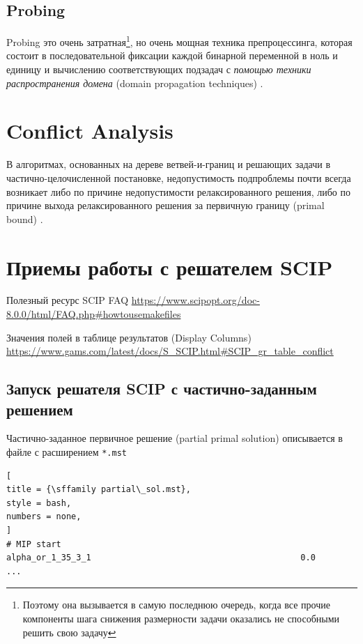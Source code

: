 \documentclass[%
	11pt,
	a4paper,
	utf8,
		]{article}
\begin{document}
\subsection{Probing}

Probing это очень затратная\footnote{Поэтому она вызывается в самую последнюю очередь, когда все прочие компоненты шага снижения размерности задачи оказались не способными решить свою задачу}, но очень мощная техника препроцессинга, которая состоит в последовательной фиксации каждой бинарной переменной в ноль и единицу и вычислению соответствующих подзадач с \emph{помощью техники распространения домена} (domain propagation techniques) \cite[]{achterberg:constr_int_prog}. 

\section{Conflict Analysis}

В алгоритмах, основанных на дереве ветвей-и-границ и решающих задачи в частично-целочисленной постановке, недопустимость подпроблемы почти всегда возникает либо по причине недопустимости релаксированного решения, либо по причине выхода релаксированного решения за первичную границу (primal bound) \cite[]{achterberg:constr_int_prog}. 

\section{Приемы работы с решателем SCIP}

Полезный ресурс SCIP FAQ \url{https://www.scipopt.org/doc-8.0.0/html/FAQ.php#howtousemakefiles}

Значения полей в таблице результатов (Display Columns) \url{https://www.gams.com/latest/docs/S_SCIP.html#SCIP_gr_table_conflict}

\subsection{Запуск решателя SCIP с частично-заданным решением}

Частично-заданное первичное решение (partial primal solution) описывается в файле с расширением \verb|*.mst|
\begin{lstlisting}[
title = {\sffamily partial\_sol.mst},
style = bash,
numbers = none,
]
# MIP start
alpha_or_1_35_3_1                                          0.0
...
\end{lstlisting}
\end{document}
